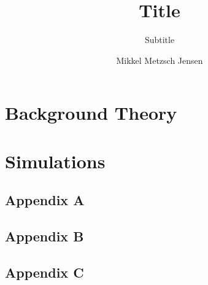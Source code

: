 \documentclass[UKenglish]{book}
\title{Title}
\subtitle{Subtitle}
\author{Mikkel Metzsch Jensen}
\begin{document}
\duoforside[dept={Department of Physics}, program={Master's Program Name},long]

\frontmatter{}


\setcounter{tocdepth}{3} %
\setcounter{secnumdepth}{3} %
\tableofcontents{}


\mainmatter{}

\newpage
\part{Background Theory}


% 
% 

\newpage
\part{Simulations}





\backmatter{}
\begin{appendices}


\appendix
\chapter{Appendix A}
\renewcommand{\thechapter}{A}
\renewcommand{\theequation}{\thechapter.\arabic{equation}}
% 

\chapter{Appendix B}
\renewcommand{\thechapter}{B}
\renewcommand{\theequation}{\thechapter.\arabic{equation}}
% 

\chapter{Appendix C}
\renewcommand{\thechapter}{C}
\renewcommand{\theequation}{\thechapter.\arabic{equation}}
% 

\end{appendices}



\end{document}
